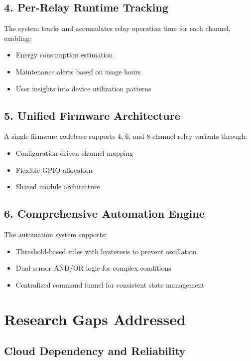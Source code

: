 \subsection{4. Per-Relay Runtime Tracking}

The system tracks and accumulates relay operation time for each channel, enabling:

\begin{itemize}
    \item Energy consumption estimation
    \item Maintenance alerts based on usage hours
    \item User insights into device utilization patterns
\end{itemize}

\subsection{5. Unified Firmware Architecture}

A single firmware codebase supports 4, 6, and 8-channel relay variants through:

\begin{itemize}
    \item Configuration-driven channel mapping
    \item Flexible GPIO allocation
    \item Shared module architecture
\end{itemize}

\subsection{6. Comprehensive Automation Engine}

The automation system supports:

\begin{itemize}
    \item Threshold-based rules with hysteresis to prevent oscillation
    \item Dual-sensor AND/OR logic for complex conditions
    \item Centralized command funnel for consistent state management
\end{itemize}

\section{Research Gaps Addressed}

\subsection{Cloud Dependency and Reliability}

